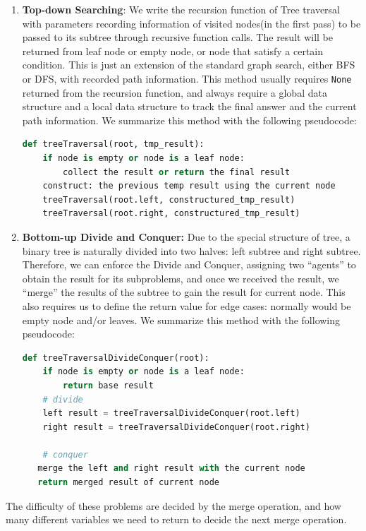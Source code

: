 \documentclass[../main.tex]{subfiles}
\begin{document}
\begin{enumerate}
    \item \textbf{Top-down Searching}: We write the recursion function of Tree traversal with parameters recording information of visited nodes(in the first pass) to be passed to its subtree through recursive function calls. The result will be returned from leaf node or empty node, or node that satisfy a certain condition. This is just an extension of the standard graph search, either BFS or DFS, with recorded path information. This method usually requires \texttt{None} returned from the recursion function, and always require a global data structure and a local data structure to track the final answer and the current path information. We summarize this method with the following pseudocode:
\begin{lstlisting}[language=Python]
def treeTraversal(root, tmp_result):
    if node is empty or node is a leaf node:
        collect the result or return the final result
    construct: the previous temp result using the current node
    treeTraversal(root.left, constructured_tmp_result)
    treeTraversal(root.right, constructured_tmp_result)
\end{lstlisting}

\item \textbf{Bottom-up Divide and Conquer:} Due to the special structure of tree, a binary tree is naturally divided into two halves: left subtree and right subtree. Therefore, we can enforce the Divide and Conquer, assigning two ``agents'' to obtain the result for its subproblems, and once we received the result, we ``merge'' the results of the subtree to gain the result for current node. This also requires us to define the return value for edge cases: normally would be empty node and/or leaves.  We summarize this method with the following pseudocode:
\begin{lstlisting}[language=Python]
def treeTraversalDivideConquer(root):
    if node is empty or node is a leaf node:
        return base result
    # divide
    left result = treeTraversalDivideConquer(root.left)
    right result = treeTraversalDivideConquer(root.right)
    
    # conquer
   merge the left and right result with the current node
   return merged result of current node
\end{lstlisting}
\end{enumerate}
The difficulty of these problems are decided by the merge operation, and how many different variables we need to return to decide the next merge operation. 
\end{document}
